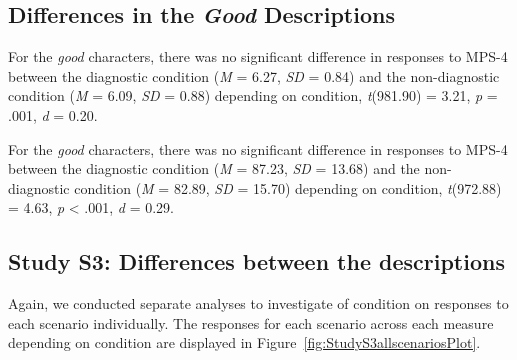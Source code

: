 \documentclass[
  man,floatsintext]{apa6}
\begin{document}
\subsection{\texorpdfstring{Differences in the \emph{Good} Descriptions}{Differences in the Good Descriptions}}\label{differences-in-the-good-descriptions-1}

For the \emph{good} characters, there was no significant difference in responses to MPS-4 between the diagnostic condition (\emph{M} = 6.27, \emph{SD} = 0.84) and the non-diagnostic condition (\emph{M} = 6.09, \emph{SD} = 0.88) depending on condition, \emph{t}(981.90) = 3.21, \emph{p} = .001, \emph{d} = 0.20.

For the \emph{good} characters, there was no significant difference in responses to MPS-4 between the diagnostic condition (\emph{M} = 87.23, \emph{SD} = 13.68) and the non-diagnostic condition (\emph{M} = 82.89, \emph{SD} = 15.70) depending on condition, \emph{t}(972.88) = 4.63, \emph{p} \textless{} .001, \emph{d} = 0.29.

\subsection{Study S3: Differences between the descriptions}\label{study-s3-differences-between-the-descriptions}

Again, we conducted separate analyses to investigate of condition on responses to each scenario individually. The responses for each scenario across each measure depending on condition are displayed in Figure~\ref{fig:StudyS3allscenariosPlot}.
\end{document}
